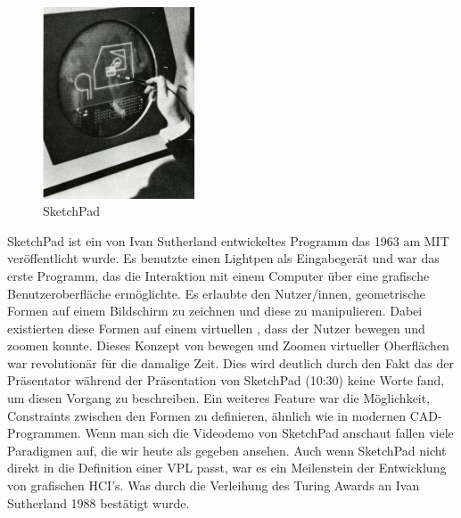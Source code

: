 \documentclass[ngerman]{article}
\begin{document}
\begin{minipage}{\linewidth}
\begin{figure}
  \centering
  \includegraphics[width=0.4\textwidth]{./graphics/sketchpad-sutherland.jpg} %
  \caption{SketchPad \cite{sutherlandSketchpad}}
\end{figure}
SketchPad ist ein von Ivan Sutherland entwickeltes Programm das 1963 am MIT veröffentlicht wurde. 
Es benutzte einen Lightpen als Eingabegerät und war das erste Programm, das die Interaktion mit einem Computer über eine grafische Benutzeroberfläche ermöglichte. 
Es erlaubte den Nutzer/innen, geometrische Formen auf einem Bildschirm zu zeichnen und diese zu manipulieren.
  Dabei existierten diese Formen auf einem virtuellen , dass der Nutzer bewegen und zoomen konnte. Dieses Konzept von bewegen und Zoomen virtueller Oberflächen war revolutionär für die damalige Zeit.
  Dies wird deutlich durch den Fakt das der Präsentator während der Präsentation von SketchPad \cite{sketchpadDemo} (10:30) keine Worte fand, um diesen Vorgang zu beschreiben.
Ein weiteres Feature war die Möglichkeit, Constraints zwischen den Formen zu definieren, ähnlich wie in modernen CAD-Programmen. 
Wenn man sich die Videodemo von SketchPad anschaut fallen viele Paradigmen auf, die wir heute als gegeben ansehen.
Auch wenn SketchPad nicht direkt in die Definition einer VPL passt, war es ein Meilenstein der Entwicklung von grafischen HCI's. Was durch die Verleihung des Turing Awards an Ivan Sutherland 1988 bestätigt wurde.
\end{minipage}
\endgroup
\end{document}
